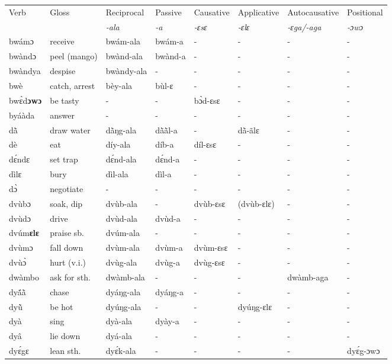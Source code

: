 \begin{sidewaystable}
\begin{tabular}{llllllll}
 \lsptoprule
 Verb & Gloss & Reciprocal & Passive  & Causative  & Applicative   & Autocausative & Positional   \\
  &    & {\itshape -ala} & {\itshape -a} & {\itshape -ɛsɛ} & {\itshape -ɛlɛ} & {\itshape -ɛga/-aga}  & {\itshape -ɔwɔ}  \\
\midrule
bwámɔ & receive & bwám-ala & bwám-a & - & - & - & - \\
bwàndɔ & peel (mango) & bwànd-ala & bwànd-a & - & -  & - & - \\
bwàndya & despise &  bwàndy-ala & - & - & - & - & - \\
bwè & catch, arrest & bèy-ala & bùl-ɛ & - & -  & - & - \\
bwɛ̀d{\bfseries ɔwɔ} & be tasty & - & -  & bɔ̀d-ɛsɛ  & - & - & - \\
byáàda & answer & - & - & - & - & - & - \\
dã̀ & draw water & dã̀ŋg-ala & dã̀ã̀l-a & - & dã̀-ãlɛ & - & - \\
dè & eat & díy-ala & díb-a & díl-ɛsɛ & - & - & - \\
dɛ́ndɛ & set trap & dɛ́nd-ala & dɛ́nd-a & - & - & - & - \\
dìlɛ & bury & dìl-ala & dìl-a & - & - & - & - \\
dɔ̀ & negotiate & - & - & - & - & - & -  \\
dvùbɔ & soak, dip & dvùb-ala & - & dvùb-ɛsɛ & (dvùb-ɛlɛ) & - & - \\
dvùdɔ & drive & dvùd-ala & dvùd-a & - & - & - & - \\
dvúm{\bfseries ɛlɛ} & praise sb. & dvúm-ala & - & - & - & - & - \\
dvùmɔ & fall down & dvùm-ala & dvùm-a & dvùm-ɛsɛ & - & - & - \\
dvùɔ̀ & hurt (v.i.)  & dvùg-ala & dvùg-a & dvùg-ɛsɛ  & - & - & - \\
dwàmbo & ask for sth. & dwàmb-ala & - & - & - & dwàmb-aga & - \\
dyã́ã̀ & chase & dyáŋg-ala & dyáŋg-a & - & - & - & - \\
dyũ̀ & be hot & dyúŋg-ala & - & - &  dyúŋg-ɛlɛ & -  & - \\
dyà & sing &  dyà-ala & dyày-a & - & - & - & - \\
dyâ & lie down & dyá-ala & - & - & - & - & - \\
dyɛ́gɛ & lean sth. & dyɛ́k-ala & - & - & - & - & dyɛ́g-ɔwɔ \\
\midrule\end{tabular}\end{sidewaystable}

